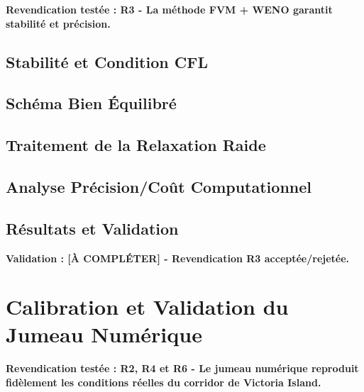 \textbf{Revendication testée : R3 - La méthode FVM + WENO garantit stabilité et précision.}

\subsection{Stabilité et Condition CFL}
\label{subsec:stabilite_cfl}

\subsection{Schéma Bien Équilibré}
\label{subsec:schema_equilibre}

\subsection{Traitement de la Relaxation Raide}
\label{subsec:relaxation_raide}

\subsection{Analyse Précision/Coût Computationnel}
\label{subsec:precision_cout}

\subsection{Résultats et Validation}
\label{subsec:resultats_numerique}

\textbf{Validation : [À COMPLÉTER] - Revendication R3 acceptée/rejetée.}

\section{Calibration et Validation du Jumeau Numérique}
\label{sec:validation_jumeau_numerique}

\textbf{Revendication testée : R2, R4 et R6 - Le jumeau numérique reproduit fidèlement les conditions réelles du corridor de Victoria Island.}

